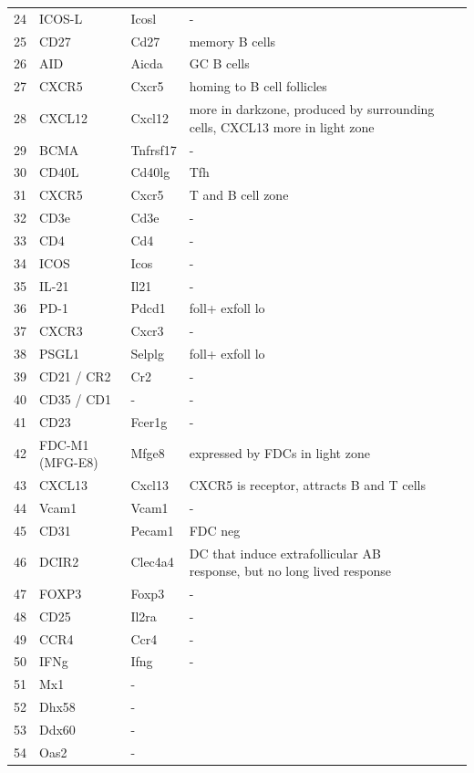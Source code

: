 \begin{table}[ht]
{\begin{tabular}{llllll}
        24 &  ICOS-L & Icosl & - \\
        25 &  CD27 & Cd27 & memory B cells  \\
        26 &  AID & Aicda & GC B cells  \\
        27 &  CXCR5 & Cxcr5 & homing to B cell follicles  \\
        28 & CXCL12 & Cxcl12 & {more in darkzone, produced by surrounding cells, CXCL13 more in light zone}  \\
        29 &  BCMA & Tnfrsf17 & - \\
        30 &  CD40L & Cd40lg & Tfh \\
        31 &  CXCR5 & Cxcr5 & T and B cell zone  \\
        32 &  CD3e & Cd3e & - \\
        33 &  CD4 & Cd4 & - \\
        34 &  ICOS & Icos & - \\
        35 &  IL-21  & Il21 & - \\
        36 &  PD-1 & Pdcd1 & foll+ exfoll lo \\
        37 &  CXCR3 & Cxcr3 & - \\
        38 &  PSGL1 & Selplg & foll+ exfoll lo \\
        39 &  CD21 / CR2 & Cr2 & - \\
        40 & CD35 / CD1 & - & - \\
        41 &  CD23  & Fcer1g & - \\
        42 &  FDC-M1 (MFG-E8) & Mfge8 & expressed by FDCs in light zone \\
        43 &  CXCL13 & Cxcl13 & CXCR5 is receptor, attracts B and T cells  \\
        44 &  Vcam1 & Vcam1 & - \\
        45 &  CD31 & Pecam1 & FDC neg \\
        46 &  DCIR2 & Clec4a4 & {DC that induce extrafollicular AB response, but no long lived response}  \\
        47 &  FOXP3 & Foxp3 & - \\
        48 &  CD25 & Il2ra & - \\
        49 &  CCR4 & Ccr4 & - \\
        50 &  IFNg & Ifng & - \\
        51 &  Mx1 & - \\
        52 &  Dhx58 & - \\
        53 &  Ddx60 & - \\
        54 &  Oas2 & - \\

\end{tabular}}
\end{table}
